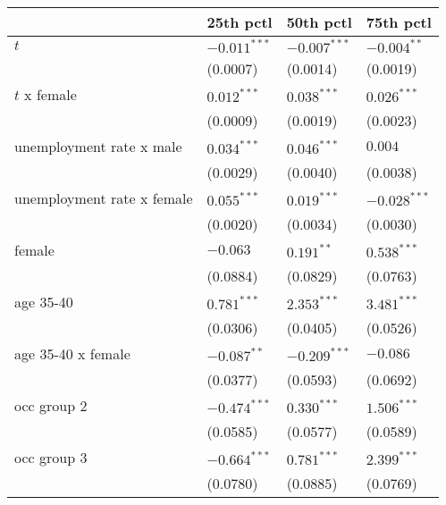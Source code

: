 \begin{tabular}{llll}
\toprule
{} &       25th pctl &       50th pctl &       75th pctl \\
\midrule
$t$                                    &  $-0.011^{***}$ &  $-0.007^{***}$ &   $-0.004^{**}$ \\
                                       &        (0.0007) &        (0.0014) &        (0.0019) \\
$t$ x female                           &   $0.012^{***}$ &   $0.038^{***}$ &   $0.026^{***}$ \\
                                       &        (0.0009) &        (0.0019) &        (0.0023) \\
unemployment rate x male               &   $0.034^{***}$ &   $0.046^{***}$ &         $0.004$ \\
                                       &        (0.0029) &        (0.0040) &        (0.0038) \\
unemployment rate x female             &   $0.055^{***}$ &   $0.019^{***}$ &  $-0.028^{***}$ \\
                                       &        (0.0020) &        (0.0034) &        (0.0030) \\
female                                 &        $-0.063$ &    $0.191^{**}$ &   $0.538^{***}$ \\
                                       &        (0.0884) &        (0.0829) &        (0.0763) \\
age 35-40                              &   $0.781^{***}$ &   $2.353^{***}$ &   $3.481^{***}$ \\
                                       &        (0.0306) &        (0.0405) &        (0.0526) \\
age 35-40 x female                     &   $-0.087^{**}$ &  $-0.209^{***}$ &        $-0.086$ \\
                                       &        (0.0377) &        (0.0593) &        (0.0692) \\
occ group 2                            &  $-0.474^{***}$ &   $0.330^{***}$ &   $1.506^{***}$ \\
                                       &        (0.0585) &        (0.0577) &        (0.0589) \\
occ group 3                            &  $-0.664^{***}$ &   $0.781^{***}$ &   $2.399^{***}$ \\
                                       &        (0.0780) &        (0.0885) &        (0.0769) \\

\end{tabular}
